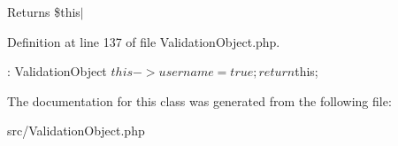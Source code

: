 \begin{DoxyReturn}{\-Returns}
\$this$|$ 
\end{DoxyReturn}


\-Definition at line 137 of file \-Validation\-Object.\-php.


\begin{DoxyCode}
                              : ValidationObject
    {
        $this->username = true;

        return $this;
    }
\end{DoxyCode}


\-The documentation for this class was generated from the following file\-:\begin{DoxyCompactItemize}
\item 
src/\-Validation\-Object.\-php\end{DoxyCompactItemize}
